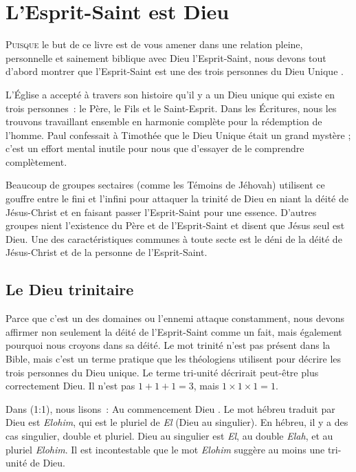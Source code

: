 \chapter{L'Esprit-Saint est Dieu}

\lettrine[lines=3]{P}{uisque} le but de ce livre est de vous amener dans une relation pleine, personnelle et sainement biblique avec Dieu l'Esprit-Saint, nous devons tout d'abord montrer que l'Esprit-Saint est une des trois personnes du Dieu Unique .

L'Église a accepté à travers son histoire qu'il y a un Dieu unique qui existe en trois personnes~: le Père, le Fils et le Saint-Esprit. Dans les Écritures, nous les trouvons travaillant ensemble en harmonie complète pour la rédemption de l'homme. Paul confessait à Timothée que le Dieu Unique était un grand mystère ; c'est un effort mental inutile pour nous que d'essayer de le comprendre complètement.

Beaucoup de groupes sectaires (comme les Témoins de Jéhovah) utilisent ce gouffre entre le fini et l'infini pour attaquer la trinité de Dieu en niant la déité de Jésus-Christ et en faisant passer l'Esprit-Saint pour une essence. D'autres groupes nient l'existence du Père et de l'Esprit-Saint et disent que Jésus seul est Dieu. Une des caractéristiques communes à toute secte est le déni de la déité de Jésus-Christ et de la personne de l'Esprit-Saint.

\section{Le Dieu trinitaire}

Parce que c'est un des domaines ou l'ennemi attaque constamment, nous devons affirmer non seulement la déité de l'Esprit-Saint comme un fait, mais également pourquoi nous croyons dans sa déité. Le mot \og trinité \fg{} n'est pas présent dans la Bible, mais c'est un terme pratique que les théologiens utilisent pour décrire les trois personnes du Dieu unique. Le terme \og tri-unité \fg{} décrirait peut-être plus correctement Dieu. Il n'est pas $1 + 1 + 1 = 3$, mais $1 \times 1 \times 1 = 1$.

Dans (1:1), nous lisons~: \og Au commencement Dieu \fg{}. Le mot hébreu traduit par \og Dieu \fg{} est \emph{Elohim}, qui est le pluriel de \emph{El} (Dieu au singulier). En hébreu, il y a des cas singulier, double et pluriel. \og Dieu \fg{} au singulier est \emph{El}, au double \emph{Elah}, et au pluriel \emph{Elohim}. Il est incontestable que le mot \emph{Elohim} suggère au moins une tri-unité de Dieu.

